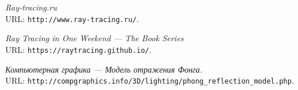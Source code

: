 \begin{thebibliography}{99}
{\itshape Ray-tracing.ru} \\URL: \texttt{http://www.ray-tracing.ru/}.

{\itshape Ray Tracing in One Weekend --- The Book Series} \\URL: \texttt{https://raytracing.github.io/}.

{\itshape Компьютерная графика --- Модель отражения Фонга.} \\URL: \texttt{http://compgraphics.info/3D/lighting/phong\_reflection\_model.php}.
\end{thebibliography}

